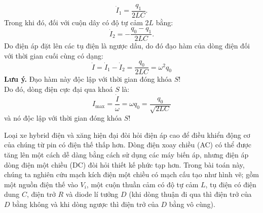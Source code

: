 \begin{loigiai}
    \[\dot{I}_{1}=\dfrac{q_{1}}{2 L C}.\tag{3.4} \label{q.11.3.4}\]
    Trong khi đó, đối với cuộn dây có độ tự cảm $2 L$ bằng:
    \[\dot{I}_{2}=-\dfrac{q_{0}-q_{1}}{2 L C}. \tag{3.5} \label{q.11.3.5}\]
    Do điện áp đặt lên các tụ điện là ngược dấu, do đó đạo hàm của dòng điện đối với thời gian cuối cùng có dạng:
    \[\dot{I} = \dot{I}_{1} - \dot{I}_{2} = \dfrac{q_{0}}{2 L C} = \omega^{2} q_{0}\tag{3.6} \label{q.11.3.6}\]
    \textbf{Lưu ý.} Đạo hàm này độc lập với thời gian đóng khóa $S$!\\
    Do đó, dòng điện cực đại qua khoá $S$ là:
    \[I_{\max }=\dfrac{\dot{I}}{\omega}=\omega q_{0} = \dfrac{q_{0}}{\sqrt{2 L C}}\tag{3.7} \label{q.11.3.7}\]
    và nó độc lập với thời gian đóng khóa $S$!


\end{loigiai}
\begin{vd}
Loại xe hybrid điện và xăng hiện đại đòi hỏi điện áp cao để điều khiển động cơ của chúng từ pin có điện thế thấp hơn. Dòng điện xoay chiều (AC) có thể được tăng lên một cách dễ dàng bằng cách sử dụng các máy biến áp, nhưng điện áp dòng điện một chiều (DC) đòi hỏi thiết kế phức tạp hơn. Trong bài toán này, chúng ta nghiên cứu mạch kích điện một chiều có mạch cấu tạo như hình vẽ; gồm một nguồn điện thế vào $V_{i}$, một cuộn thuần cảm có độ tự cảm $L$, tụ điện có điện dung $C$, điện trở $R$ và diode lí tưởng $D$ (khi dòng thuận đi qua thì điện trở của $D$ bằng không và khi dòng ngược thì điện trở của $D$ bằng vô cùng).
\begin{center}
    


\begin{tikzpicture}[x=0.75pt,y=0.75pt,yscale=-1,xscale=1]


\end{tikzpicture}
\end{center}
\end{vd}
